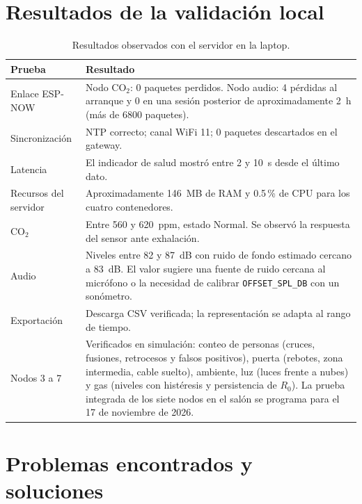 \documentclass[11pt,a4paper]{article}
\begin{document}
\section{Resultados de la validaci\'on local}

\begin{table}[H]
\centering
\caption{Resultados observados con el servidor en la laptop.}
\begin{tabularx}{\textwidth}{@{}lX@{}}
\toprule
\textbf{Prueba} & \textbf{Resultado} \\
\midrule
Enlace ESP-NOW & Nodo CO$_2$: 0 paquetes perdidos. Nodo audio: 4 p\'erdidas al arranque y
0 en una sesi\'on posterior de aproximadamente 2~h (m\'as de 6800 paquetes). \\
Sincronizaci\'on & NTP correcto; canal WiFi 11; 0 paquetes descartados en el gateway. \\
Latencia & El indicador de salud mostr\'o entre 2 y 10~s desde el \'ultimo dato. \\
Recursos del servidor & Aproximadamente 146~MB de RAM y 0.5\,\% de CPU para los cuatro
contenedores. \\
CO$_2$ & Entre 560 y 620~ppm, estado Normal. Se observ\'o la respuesta del sensor ante
exhalaci\'on. \\
Audio & Niveles entre 82 y 87~dB con ruido de fondo estimado cercano a 83~dB. El valor
sugiere una fuente de ruido cercana al micr\'ofono o la necesidad de calibrar
\texttt{OFFSET\_SPL\_DB} con un son\'ometro. \\
Exportaci\'on & Descarga CSV verificada; la representaci\'on se adapta al rango de tiempo. \\
Nodos 3 a 7 & Verificados en simulaci\'on: conteo de personas (cruces, fusiones, retrocesos y
falsos positivos), puerta (rebotes, zona intermedia, cable suelto), ambiente, luz (luces frente a
nubes) y gas (niveles con hist\'eresis y persistencia de $R_0$). La prueba integrada de los siete
nodos en el sal\'on se programa para el 17 de noviembre de 2026. \\
\bottomrule
\end{tabularx}
\end{table}

\section{Problemas encontrados y soluciones}
\end{document}

